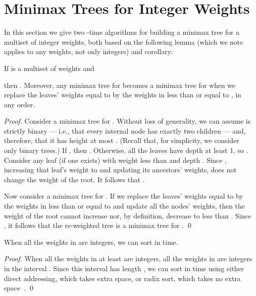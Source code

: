 \documentclass[runningheads]{llncs}
\begin{document}
\section{Minimax Trees for Integer Weights} \label{sec:ints}

In this section we give two -time algorithms for building a minimax tree for a multiset of integer weights, both based on the following lemma (which we note applies to any weights, not only integers) and corollary:

\begin{lemma} \label{lem:replacement}
If  is a multiset of weights and

then .  Moreover, any minimax tree for  becomes a minimax tree for  when we replace the leaves' weights equal to  by the weights in  less than or equal to , in any order.
\end{lemma}

\begin{proof}
Consider a minimax tree  for .  Without loss of generality, we can assume  is strictly binary --- i.e., that every internal node has exactly two children --- and, therefore, that it has height at most .  (Recall that, for simplicity, we consider only binary trees.)  If , then .  Otherwise, all the leaves have depth at least 1, so .  Consider any leaf (if one exists) with weight less than  and depth .  Since , increasing that leaf's weight to  and updating its ancestors' weights, does not change the weight  of the root.  It follows that .

Now consider a minimax tree  for .  If we replace the leaves' weights equal to  by the weights in  less than or equal to  and update all the nodes' weights, then the weight  of the root cannot increase nor, by definition, decrease to less than .  Since , it follows that the re-weighted tree is a minimax tree for . \qed
\end{proof}

\begin{corollary} \label{cor:sorting}
When all the weights in  are integers, we can sort  in  time.
\end{corollary}

\begin{proof}
When all the weights in  at least  are integers, all the weights in  are integers in the interval .  Since this interval has length , we can sort  in  time using either direct addressing, which takes  extra space, or radix sort, which takes no extra space~\cite{FMP07}. \qed
\end{proof}
\end{document}
